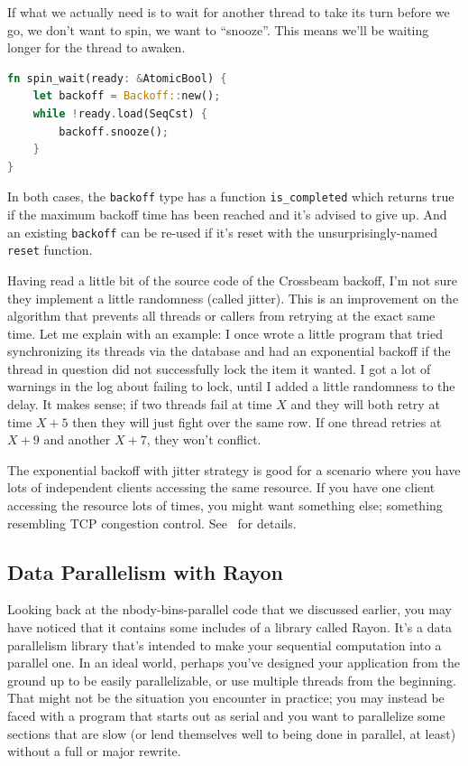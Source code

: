 \documentclass[a4paper]{report}
\begin{document}
\begin{appendices}
If what we actually need is to wait for another thread to take its turn before we go, we don't want to spin, we want to ``snooze''. This means we'll be waiting longer for the thread to awaken.

\begin{lstlisting}[language=Rust]
fn spin_wait(ready: &AtomicBool) {
    let backoff = Backoff::new();
    while !ready.load(SeqCst) {
        backoff.snooze();
    }
}
\end{lstlisting}

In both cases, the \texttt{backoff} type has a function \texttt{is\_completed} which returns true if the maximum backoff time has been reached and it's advised to give up. And an existing \texttt{backoff} can be re-used if it's reset with the unsurprisingly-named \texttt{reset} function.

Having read a little bit of the source code of the Crossbeam backoff, I'm not sure they implement a little randomness (called jitter). This is an improvement on the algorithm that prevents all threads or callers from retrying at the exact same time. Let me explain with an example: I once wrote a little program that tried synchronizing its threads via the database and had an exponential backoff if the thread in question did not successfully lock the item it wanted. I got a lot of warnings in the log about failing to lock, until I added a little randomness to the delay. It makes sense; if two threads fail at time $X$ and they will both retry at time $X+5$ then they will just fight over the same row. If one thread retries at $X+9$ and another $X+7$, they won't conflict.

The exponential backoff with jitter strategy is good for a scenario where you have lots of independent clients accessing the same resource. If you have one client accessing the resource lots of times, you might want something else; something resembling TCP congestion control. See~\cite{expbackoff} for details. 

\subsection*{Data Parallelism with Rayon}

Looking back at the nbody-bins-parallel code that we discussed earlier, you may have noticed that it contains some includes of a library called Rayon. It's a data parallelism library that's intended to make your sequential computation into a parallel one. In an ideal world, perhaps you've designed your application from the ground up to be easily parallelizable, or use multiple threads from the beginning. That might not be the situation you encounter in practice; you may instead be faced with a program that starts out as serial and you want to parallelize some sections that are slow (or lend themselves well to being done in parallel, at least) without a full or major rewrite.


\end{appendices}
\end{document}
